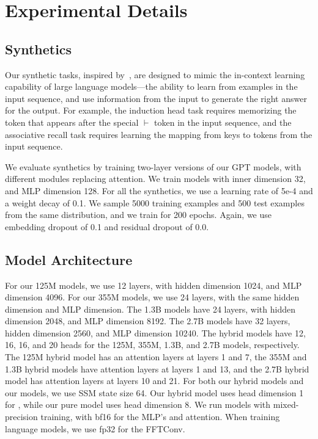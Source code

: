 \section{Experimental Details \label{sec:app_exp_details}}

\subsection{Synthetics}
Our synthetic tasks, inspired by~\citep{olsson2022context}, are designed to mimic the in-context learning capability of large language models---the ability to learn from examples in the input sequence, and use information from the input to generate the right answer for the output.
For example, the induction head task requires memorizing the token that appears after the special $\vdash$ token in the input sequence, and the associative recall task requires learning the mapping from keys to tokens from the input sequence.

We evaluate synthetics by training two-layer versions of our GPT models, with different modules replacing attention.
We train models with inner dimension 32, and MLP dimension 128.
For all the synthetics, we use a learning rate of 5e-4 and a weight decay of 0.1.
We sample 5000 training examples and 500 test examples from the same distribution, and we train for 200 epochs.
Again, we use embedding dropout of 0.1 and residual dropout of 0.0.

\subsection{Model Architecture}
For our 125M models, we use 12 layers, with hidden dimension 1024, and MLP dimension 4096.
For our 355M models, we use 24 layers, with the same hidden dimension and MLP dimension.
The 1.3B models have 24 layers, with hidden dimension 2048, and MLP dimension 8192.
The 2.7B models have 32 layers, hidden dimension 2560, and MLP dimension 10240.
The hybrid models have 12, 16, 16, and 20 heads for the 125M, 355M, 1.3B, and 2.7B models, respectively.
The 125M hybrid model has an attention layers at layers 1 and 7, the 355M and 1.3B hybrid models have attention layers at layers 1 and 13, and the 2.7B hybrid model has attention layers at layers 10 and 21.
For both our hybrid models and our \hthree models, we use SSM state size 64.
Our hybrid model uses head dimension 1 for \hthree, while our pure \hthree model uses head dimension 8.
We run models with mixed-precision training, with bf16 for the MLP's and attention.
When training language models, we use fp32 for the FFTConv.

